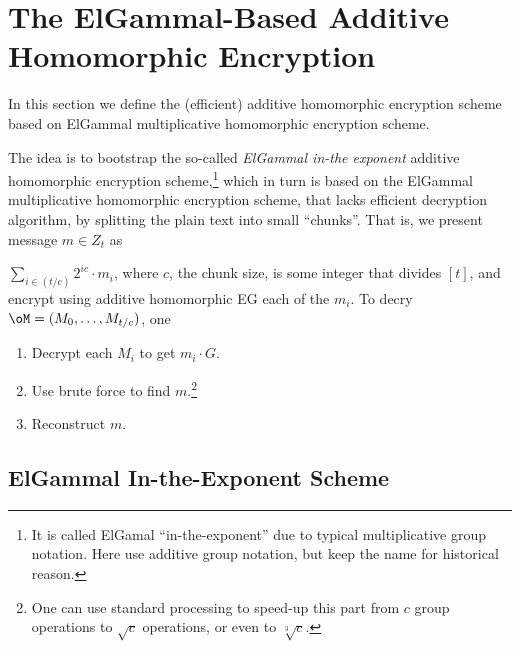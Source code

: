 \section{The ElGammal-Based  Additive Homomorphic Encryption }\label{sec:ChanksEG}
In this section we define the (efficient)  additive homomorphic encryption scheme based on ElGammal multiplicative  homomorphic encryption scheme.  


The idea is to bootstrap the so-called   \textit{ElGammal in-the exponent}   additive homomorphic encryption  scheme,\footnote{It is called ElGamal ``in-the-exponent'' due to typical multiplicative group notation. Here use additive group notation, but keep the name for historical reason.}  which in turn is based on the  ElGammal multiplicative  homomorphic encryption scheme, that lacks efficient decryption algorithm, by splitting the plain text into small ``chunks''. That  is, we present message $m\in Z_t$ as

$\sum_{i \in (t/c)}   2^{i c} \cdot m_i$, where $c$, the chunk size, is  some integer that divides $[t]$, and encrypt using    additive homomorphic EG each of the $m_i$. To decry $\oM= (M_0,\ldots,M_{t/c})$, one  
\begin{enumerate}
	\item Decrypt   each $M_i$ to get $m_i  \cdot G$.
	\item Use brute force to find $m$.\footnote{One can use standard   processing to speed-up this part from $c$ group operations to $\sqrt{c}$  operations, or even  to   $\sqrt[3]{c}$.}
	
	\item Reconstruct $m$.
\end{enumerate}



\subsection{ElGammal In-the-Exponent Scheme}\label{sec:ChanksEG:EG}
\newcommand{\EgKG}{\MathAlgX{EgGen}}
\newcommand{\EgEnc}{\MathAlgX{EgEnc}}
\newcommand{\EgDec}{\MathAlgX{EgDec}}

